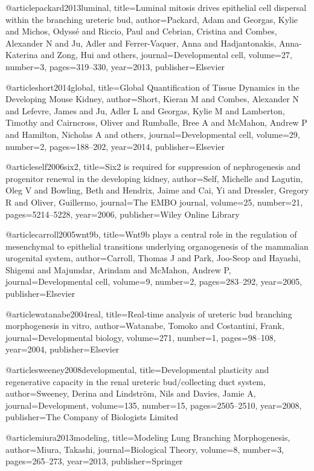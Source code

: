 @article{packard2013luminal,
  title={Luminal mitosis drives epithelial cell dispersal within the branching ureteric bud},
  author={Packard, Adam and Georgas, Kylie and Michos, Odyss{\'e} and Riccio, Paul and Cebrian, Cristina and Combes, Alexander N and Ju, Adler and Ferrer-Vaquer, Anna and Hadjantonakis, Anna-Katerina and Zong, Hui and others},
  journal={Developmental cell},
  volume={27},
  number={3},
  pages={319--330},
  year={2013},
  publisher={Elsevier}
}

@article{short2014global,
  title={Global Quantification of Tissue Dynamics in the Developing Mouse Kidney},
  author={Short, Kieran M and Combes, Alexander N and Lefevre, James and Ju, Adler L and Georgas, Kylie M and Lamberton, Timothy and Cairncross, Oliver and Rumballe, Bree A and McMahon, Andrew P and Hamilton, Nicholas A and others},
  journal={Developmental cell},
  volume={29},
  number={2},
  pages={188--202},
  year={2014},
  publisher={Elsevier}
}

@article{self2006six2,
  title={Six2 is required for suppression of nephrogenesis and progenitor renewal in the developing kidney},
  author={Self, Michelle and Lagutin, Oleg V and Bowling, Beth and Hendrix, Jaime and Cai, Yi and Dressler, Gregory R and Oliver, Guillermo},
  journal={The EMBO journal},
  volume={25},
  number={21},
  pages={5214--5228},
  year={2006},
  publisher={Wiley Online Library}
}

@article{carroll2005wnt9b,
  title={Wnt9b plays a central role in the regulation of mesenchymal to epithelial transitions underlying organogenesis of the mammalian urogenital system},
  author={Carroll, Thomas J and Park, Joo-Seop and Hayashi, Shigemi and Majumdar, Arindam and McMahon, Andrew P},
  journal={Developmental cell},
  volume={9},
  number={2},
  pages={283--292},
  year={2005},
  publisher={Elsevier}
}

@article{watanabe2004real,
  title={Real-time analysis of ureteric bud branching morphogenesis in vitro},
  author={Watanabe, Tomoko and Costantini, Frank},
  journal={Developmental biology},
  volume={271},
  number={1},
  pages={98--108},
  year={2004},
  publisher={Elsevier}
}

@article{sweeney2008developmental,
  title={Developmental plasticity and regenerative capacity in the renal ureteric bud/collecting duct system},
  author={Sweeney, Derina and Lindstr{\"o}m, Nils and Davies, Jamie A},
  journal={Development},
  volume={135},
  number={15},
  pages={2505--2510},
  year={2008},
  publisher={The Company of Biologists Limited}
}

@article{miura2013modeling,
  title={Modeling Lung Branching Morphogenesis},
  author={Miura, Takashi},
  journal={Biological Theory},
  volume={8},
  number={3},
  pages={265--273},
  year={2013},
  publisher={Springer}
}